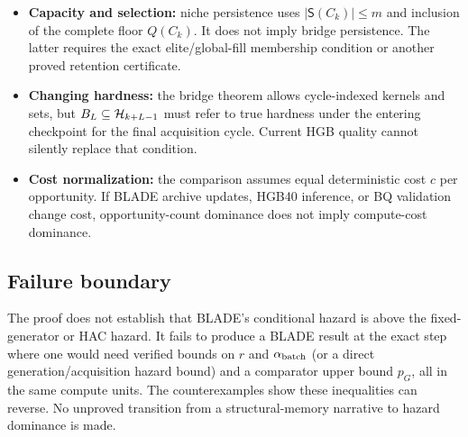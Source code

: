 \begin{itemize}
survival lemma. To pass from $D_k^{\rm gen}$ to
$D_k^{\rm acq}$, a retention condition connecting $\widehat h_k$ and the QD
rule to true $h_k^{\rm BQ}$ and future reachability is essential. Perfect
current-hardness prediction alone is insufficient when tied candidates have
different mutation futures. Without such a bridge, the implementation-level
step is OPEN.
\item \textbf{Capacity and selection:} niche persistence uses
$|\mathsf S(C_k)|\leq m$ and inclusion of the complete floor $Q(C_k)$. It does
not imply bridge persistence. The latter requires the exact elite/global-fill
membership condition or another proved retention certificate.
\item \textbf{Changing hardness:} the bridge theorem allows cycle-indexed
kernels and sets, but $B_L\subseteq\mathcal{H}_{k+L-1}$ must refer to true hardness
under the entering checkpoint for the final acquisition cycle. Current HGB
quality cannot silently replace that condition.
\item \textbf{Cost normalization:} the comparison assumes equal deterministic
cost $c$ per opportunity. If BLADE archive updates, HGB40 inference, or BQ
validation change cost, opportunity-count dominance does not imply compute-cost
dominance.
\end{itemize}

\subsection{Failure boundary}
  The proof does not establish that BLADE's conditional hazard is
above the fixed-generator or HAC hazard. It fails to produce a BLADE result
at the exact step where one would need verified bounds on $r$ and
$\alpha_{\rm batch}$ (or a direct generation/acquisition hazard bound) and a
comparator upper bound $p_G$, all in the same compute units. The
counterexamples show these inequalities can reverse. No unproved transition
from a structural-memory narrative to hazard dominance is made.
